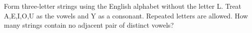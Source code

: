 Form three-letter strings using the English alphabet without the letter L. Treat A,E,I,O,U as the vowels and Y as a consonant. Repeated letters are allowed. How many strings contain no adjacent pair of distinct vowels?
